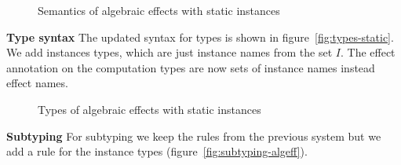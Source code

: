 {\begin{figure}
\caption{Semantics of algebraic effects with static instances}
\centering
{}
\end{figure}

\textbf{Type syntax}
The updated syntax for types is shown in figure~\ref{fig:types-static}.
We add instances types, which are just instance names from the set $I$.
The effect annotation on the computation types are now sets of instance names instead effect names.

\begin{figure}
\caption{Types of algebraic effects with static instances}
\centering
{}
\end{figure}

\textbf{Subtyping}
For subtyping we keep the rules from the previous system but we add a rule for the instance types (figure~\ref{fig:subtyping-algeff}).

}
